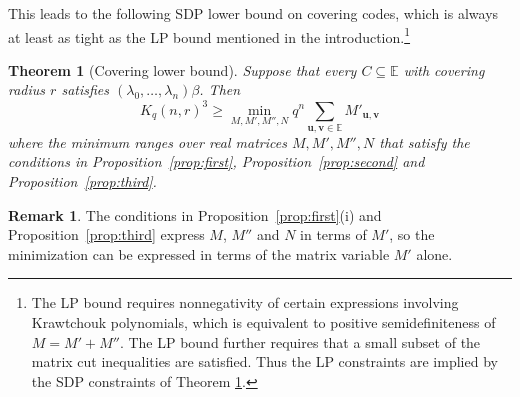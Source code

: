 \documentclass[10pt,a4paper]{article}
\newcommand{\E}{\mathbb{E}}
\newtheorem{theorem}{Theorem}[section]
\theoremstyle{definition}
\newtheorem{remark}{Remark}[section]
\newcommand{\uu}{\mathbf{u}}
\newcommand{\vv}{\mathbf{v}}
\begin{document}
This leads to the following SDP lower bound on covering codes, which is always at least as tight as the LP bound mentioned in the introduction.\footnote{The LP bound requires nonnegativity of certain expressions involving Krawtchouk polynomials, which is equivalent to positive semidefiniteness of $M=M' +M''$. The LP bound further requires that a small subset of the matrix cut inequalities are satisfied. Thus the LP constraints are implied by the SDP constraints of Theorem \ref{thm:originalbound}.}
\begin{theorem}[Covering lower bound]\label{thm:originalbound}
Suppose that every $C\subseteq \E$ with covering radius $r$ satisfies $(\lambda_0,\ldots, \lambda_n)\beta$. Then
\[
K_q(n,r)^3\geq \min_{M,M',M'',N} q^n\sum_{\uu,\vv\in \E}M'_{\uu,\vv}
\]
where the minimum ranges over real matrices $M, M',M'',N$ that satisfy the conditions in Proposition~\ref{prop:first}, Proposition~\ref{prop:second} and Proposition~\ref{prop:third}.
\end{theorem}
\begin{remark}
The conditions in Proposition~\ref{prop:first}(i) and Proposition~\ref{prop:third} express $M$, $M''$ and $N$ in terms of $M'$, so the minimization can be expressed in terms of the matrix variable $M'$ alone.
\end{remark}
\end{document}
